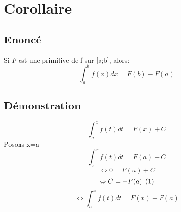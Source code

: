 \documentclass[12pt,a4paper]{report}
\begin{document}
	\section*{Corollaire}
	\subsection*{Enoncé}
	Si $F$ est une primitive de f sur [a;b], alors: \[\int_{a}^{b} f(x)dx=F(b)-F(a)\]
	\subsection*{Démonstration}
	\[ \int_{a}^{x}f(t)dt=F(x)+C \]
	Posons x=a
	\[ \int_{x}^{x}f(t)dt=F(a)+C\] \[\Leftrightarrow 0=F(a)+C \] \[ \Leftrightarrow C=-F(a) \enskip (1) \] \[ \Leftrightarrow \int_{a}^{x}f(t)dt=F(x)-F(a) \]
\end{document}
